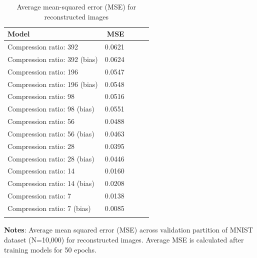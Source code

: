 \begin{table}[h]
	\caption{Average mean-squared error (MSE) for reconstructed images \label{table:mse-final}}
	\centering
	\begin{tabular}{lrrrr}
		\toprule
			Model &  MSE  \\
		\midrule
			\addlinespace{}
			\parbox{12.5cm}{Compression ratio: 392} & 0.0621 \\
			\addlinespace{}
			Compression ratio: 392 (bias) 	& 0.0624 \\
			\addlinespace{}
			Compression ratio: 196 			& 0.0547 \\
			\addlinespace{}
			Compression ratio: 196 (bias) 	& 0.0548 \\
			\addlinespace{}
			Compression ratio: 98 			& 0.0516 \\
			\addlinespace{}
			Compression ratio: 98 (bias) 	& 0.0551 \\
			\addlinespace{}
			Compression ratio: 56 			& 0.0488 \\
			\addlinespace{}
			Compression ratio: 56 (bias)	& 0.0463 \\
			\addlinespace{}
			Compression ratio: 28 			& 0.0395 \\
			\addlinespace{}
			Compression ratio: 28 (bias) 	& 0.0446 \\
			\addlinespace{}
			Compression ratio: 14 			& 0.0160 \\
			\addlinespace{}
			Compression ratio: 14 (bias) 	& 0.0208 \\
			\addlinespace{}
			Compression ratio: 7 			& 0.0138 \\
			\addlinespace{}
			Compression ratio: 7 (bias) 	& 0.0085 \\
	\bottomrule
	\addlinespace[1em]
	\end{tabular}
	\parbox{14.5cm}{\textbf{Notes}: Average mean squared error (MSE) across validation partition of MNIST dataset (N=10,000) for reconstructed images. Average MSE is calculated after training models for 50 epochs.}
\end{table}

